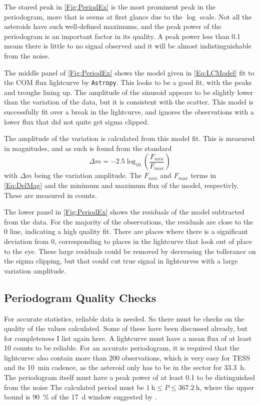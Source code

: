 \documentclass{UCreport}
\begin{document}
The stared peak in \autoref{Fig:PeriodEx} is  the most prominent peak in the periodogram, more that is seems at first glance due to the $\log$ scale.
Not all the asteroids have such well-defined maximums, and the peak power of the periodogram is an important factor in its quality.
A peak power less than 0.1 means there is little to no signal observed and it will be almost indistinguishable from the noise.

The middle panel of \autoref{Fig:PeriodEx} shows the model given in \autoref{Eq:LCModel} fit to the COM flux lightcurve by \texttt{Astropy}.
This looks to be a good fit, with the peaks and troughs lining up.
The amplitude of the sinusoid appears to be slightly lower than the variation of the data, but it is consistent with the scatter.
This model is successfully fit over a break in the lightcurve, and ignores the observations with a lower flux that did not quite get sigma clipped.

The amplitude of the variation is calculated from this model fit.
This is measured in magnitudes, and as such is found from the standard
\begin{equation} \label{Eq:DelMag}
  \Delta m = -2.5 \log_{10}(\frac{F_{min}}{F_{max}})
\end{equation}
with $\Delta m$ being the variation amplitude.
The $F_{min}$ and $F_{max}$ terms in \autoref{Eq:DelMag} and the minimum and maximum flux of the model, respectivly.
These are measured in counts.

The lower panel in \autoref{Fig:PeriodEx} shows the residuals of the model subtracted from the data.
For the majority of the observations, the residuals are close to the 0 line, indicating a high quality fit.
There are places where there is a significant deviation from 0, corresponding to places in the lightcurve that look out of place to the eye.
These large residuals could be removed by decreasing the tollerance on the sigma clipping, but that could cut true signal in lightcurves with a large variation amplitude.


\subsection{Periodogram Quality Checks}\label{SubSec:QualCheck}

For accurate statistics, reliable data is needed.
So there must be checks on the quality of the values calculated.
Some of these have been discussed already, but for completeness I list again here.
A lightcurve must have a mean flux of at least 10 counts to be reliable.
For an accurate periodogram, it is required that the lightcurve also contain more than 200 observations, which is very easy for TESS and its \qty{10}{\minute} cadence, as the asteroid only has to be in the sector for \qty{33.3}{\hour}.
The periodogram itself must have a peak power of at least 0.1 to be distinguished from the noise
The calculated period must be $\qty{1}{\hour}\leq P \leq \qty{367.2}{\hour}$, where the upper bound is \qty{90}{\percent} of the \qty{17}{\day} window suggested by \cite{McNeill2023}.
\end{document}
